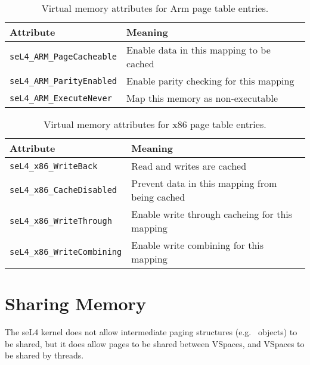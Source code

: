 \begin{table}[htb]
  \begin{center}
    \begin{tabularx}{\textwidth}{p{}X}
      \toprule
      Attribute & Meaning \\
      \midrule
      \texttt{seL4\_ARM\_PageCacheable} & Enable data in this mapping
      to be cached \\
      \texttt{seL4\_ARM\_ParityEnabled} & Enable parity checking for
      this mapping\\
      \texttt{seL4\_ARM\_ExecuteNever} & Map this memory as non-executable \\
      \bottomrule
    \end{tabularx}
    \caption{\label{tbl:vmattr_arm} Virtual memory attributes for Arm page
      table entries.}
  \end{center}
\end{table}

\begin{table}[htb]
  \begin{center}
    \begin{tabularx}{\textwidth}{p{}X}
      \toprule
      Attribute & Meaning \\
      \midrule
      \texttt{seL4\_x86\_WriteBack} & Read and writes are cached \\
      \texttt{seL4\_x86\_CacheDisabled} & Prevent data in this mapping
      from being cached \\
      \texttt{seL4\_x86\_WriteThrough} & Enable write through cacheing for this mapping \\
      \texttt{seL4\_x86\_WriteCombining} & Enable write combining for this mapping \\
      \bottomrule
    \end{tabularx}
    \caption{\label{tbl:vmattr_ia32} Virtual memory attributes for x86 page
      table entries.}
  \end{center}
\end{table}

\section{Sharing Memory}

The seL4 kernel does not allow intermediate paging structures (e.g.\  objects) to be
shared, but it does allow pages to be shared between VSpaces, and VSpaces to be shared by threads.

